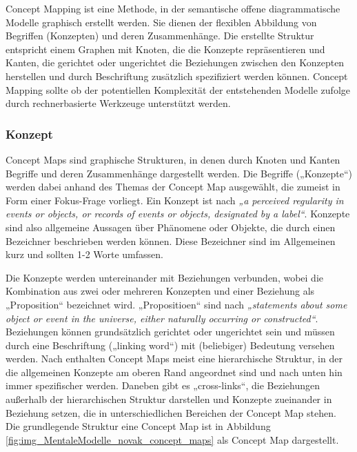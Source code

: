 Concept Mapping \citep{Novak06} ist eine Methode, in der semantische offene diagrammatische Modelle graphisch erstellt werden. Sie dienen der flexiblen Abbildung von Begriffen (Konzepten) und deren Zusammenhänge. Die erstellte Struktur entspricht einem Graphen mit Knoten, die die Konzepte repräsentieren und Kanten, die gerichtet oder ungerichtet die Beziehungen zwischen den Konzepten herstellen und durch Beschriftung zusätzlich spezifiziert werden können. Concept Mapping sollte ob der potentiellen Komplexität der entstehenden Modelle \citet{Novak06} zufolge durch rechnerbasierte Werkzeuge unterstützt werden. 

\subsubsection{Konzept}

Concept Maps sind graphische Strukturen, in denen durch Knoten und Kanten Begriffe und deren Zusammenhänge dargestellt werden. Die Begriffe („Konzepte“) werden dabei anhand des Themas der Concept Map ausgewählt, die zumeist in Form einer Fokus-Frage vorliegt. Ein Konzept ist nach \citep[][S. 1]{Novak06} \emph{„a perceived regularity in events or objects, or records of events or objects, designated by a label“}. Konzepte sind also allgemeine Aussagen über Phänomene oder Objekte, die durch einen Bezeichner beschrieben werden können. Diese Bezeichner sind im Allgemeinen kurz und sollten 1-2 Worte umfassen.

Die Konzepte werden untereinander mit Beziehungen verbunden, wobei die Kombination aus zwei oder mehreren Konzepten und einer Beziehung als „Proposition“ bezeichnet wird. „Propositioen“ sind nach \citet[][S. 1]{Novak06} \emph{„statements about some object or event in the universe, either naturally occurring or constructed“}. Beziehungen können grundsätzlich gerichtet oder ungerichtet sein und müssen durch eine Beschriftung („linking word“) mit (beliebiger) Bedeutung versehen werden. Nach \citet{Novak06} enthalten Concept Maps meist eine hierarchische Struktur, in der die allgemeinen Konzepte am oberen Rand angeordnet sind und nach unten hin immer spezifischer werden. Daneben gibt es „cross-links“, die Beziehungen außerhalb der hierarchischen Struktur darstellen und Konzepte zueinander in Beziehung setzen, die in unterschiedlichen Bereichen der Concept Map stehen. Die grundlegende Struktur eine Concept Map ist in Abbildung \ref{fig:img_MentaleModelle_novak_concept_maps} als Concept Map dargestellt.

